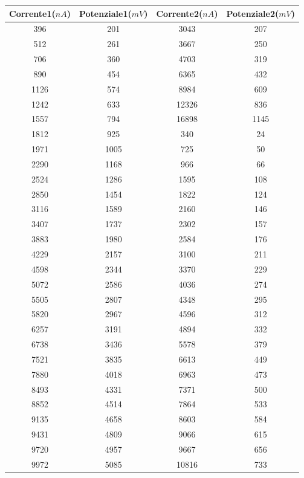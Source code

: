 \begin{center}
\begin{tabular}{*{4}{c}}
Corrente1($nA$) & Potenziale1($mV$) & Corrente2($nA$) & Potenziale2($mV$)\\
\midrule
396 & 201 & 3043 & 207\\
512 & 261 & 3667 & 250\\
706 & 360 & 4703 & 319\\
890 & 454 & 6365 & 432\\
1126 & 574 & 8984 & 609\\
1242 & 633 & 12326 & 836\\
1557 & 794 & 16898 & 1145\\
1812 & 925 & 340 & 24\\
1971 & 1005 & 725 & 50\\
2290 & 1168 & 966 & 66\\
2524 & 1286 & 1595 & 108\\
2850 & 1454 & 1822 & 124\\
3116 & 1589 & 2160 & 146\\
3407 & 1737 & 2302 & 157\\
3883 & 1980 & 2584 & 176\\
4229 & 2157 & 3100 & 211\\
4598 & 2344 & 3370 & 229\\
5072 & 2586 & 4036 & 274\\
5505 & 2807 & 4348 & 295\\
5820 & 2967 & 4596 & 312\\
6257 & 3191 & 4894 & 332\\
6738 & 3436 & 5578 & 379\\
7521 & 3835 & 6613 & 449\\
7880 & 4018 & 6963 & 473\\
8493 & 4331 & 7371 & 500\\
8852 & 4514 & 7864 & 533\\
9135 & 4658 & 8603 & 584\\
9431 & 4809 & 9066 & 615\\
9720 & 4957 & 9667 & 656\\
9972 & 5085 & 10816 & 733\\

\end{tabular}
\end{center}


